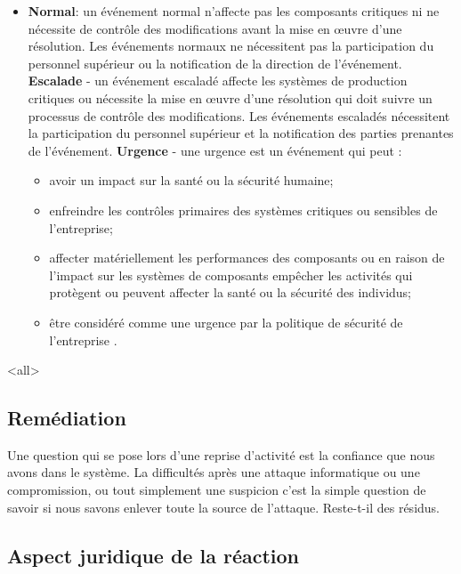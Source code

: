 \begin{itemize}
  \item  \textbf{Normal}: un événement normal n'affecte pas les composants critiques ni ne nécessite de contrôle des modifications avant la mise en œuvre d'une résolution. Les événements normaux ne nécessitent pas la participation du personnel supérieur ou la notification de la direction de l'événement.
\textbf{Escalade} - un événement escaladé affecte les systèmes de production critiques ou nécessite la mise en œuvre d'une résolution qui doit suivre un processus de contrôle des modifications. Les événements escaladés nécessitent la participation du personnel supérieur et la notification des parties prenantes de l'événement.
\textbf{Urgence} - une urgence est un événement qui peut :
\begin{itemize}
  \item avoir un impact sur la santé ou la sécurité humaine;
  \item enfreindre les contrôles primaires des systèmes critiques ou sensibles de l'entreprise;
  \item affecter matériellement les performances des composants ou en raison de l'impact sur les systèmes de composants empêcher les activités qui protègent ou peuvent affecter la santé ou la sécurité des individus;
  \item être considéré comme une urgence par la politique de sécurité de l'entreprise .
\end{itemize}

\end{itemize}

\mode<all>{}


\subsection{Remédiation}


Une question qui se pose lors d’une reprise d’activité est la confiance que nous avons dans le système. La difficultés après une attaque informatique ou une compromission, ou tout simplement une suspicion c’est la simple question de savoir si nous savons enlever toute la source de l’attaque. Reste-t-il des résidus.

\subsection{Aspect juridique de la réaction}

